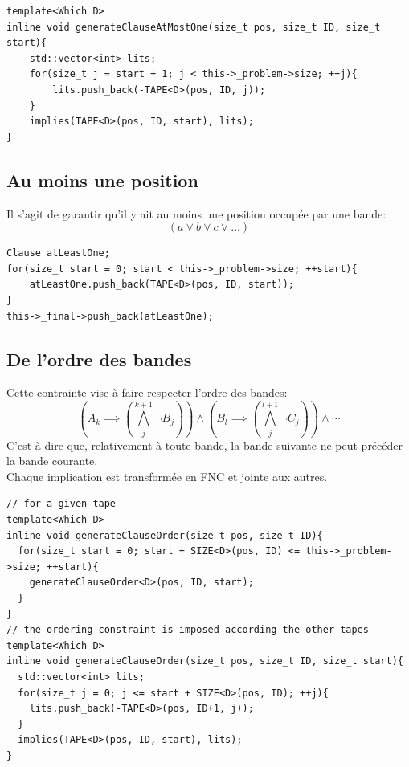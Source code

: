 \documentclass[a4paper,12pt]{report}
\begin{document}
\lstset{style=Cpp, caption=Au moins une position, label=C:atMostOne}
\begin{lstlisting}[mathescape=true]
template<Which D>
inline void generateClauseAtMostOne(size_t pos, size_t ID, size_t start){
	std::vector<int> lits;
	for(size_t j = start + 1; j < this->_problem->size; ++j){
		lits.push_back(-TAPE<D>(pos, ID, j));
	}
	implies(TAPE<D>(pos, ID, start), lits);
}
\end{lstlisting}

\subsection{Au moins une position}

Il s'agit de garantir qu'il y ait au moins une position occupée par une bande:
$$(a \vee b \vee c \vee ...)$$
\lstset{style=Cpp, caption=Au moins une position, label=C:atMostOne}
\begin{lstlisting}[mathescape=true]
Clause atLeastOne;
for(size_t start = 0; start < this->_problem->size; ++start){
	atLeastOne.push_back(TAPE<D>(pos, ID, start));
}
this->_final->push_back(atLeastOne);
\end{lstlisting}

\subsection{De l'ordre des bandes}

Cette contrainte vise à faire respecter l'ordre des bandes:
$$\left(A_k \implies \left( \bigwedge_{j}^{k+1} \lnot B_j \right)\right)\wedge \left( B_l \implies \left( \bigwedge_{j}^{l+1} \lnot C_j \right)\right)\wedge \cdots$$
C'est-à-dire que, relativement à toute bande,  la bande suivante ne peut précéder la bande courante.\\
Chaque implication est transformée en FNC et jointe aux autres.
\lstset{style=Cpp, caption=Respect de l'ordre, label=C:order}
\begin{lstlisting}[mathescape=true]
// for a given tape
template<Which D>
inline void generateClauseOrder(size_t pos, size_t ID){
  for(size_t start = 0; start + SIZE<D>(pos, ID) <= this->_problem->size; ++start){
    generateClauseOrder<D>(pos, ID, start);	
  }
}
// the ordering constraint is imposed according the other tapes
template<Which D>
inline void generateClauseOrder(size_t pos, size_t ID, size_t start){
  std::vector<int> lits;
  for(size_t j = 0; j <= start + SIZE<D>(pos, ID); ++j){
    lits.push_back(-TAPE<D>(pos, ID+1, j));
  }
  implies(TAPE<D>(pos, ID, start), lits);
}
\end{lstlisting}
\end{document}
